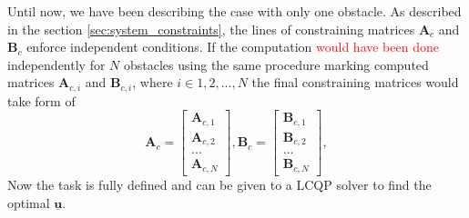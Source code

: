 \documentclass[a4paper,11pt,titlepage]{article}
\begin{document}
Until now, we have been describing the case with only one obstacle. As described in the section \ref{sec:system_constraints}, the lines of constraining matrices $\textbf{A}_c$ and $\textbf{B}_c$  enforce independent conditions. If the computation \textcolor{red}{would have been done} independently for $N$ obstacles using the same procedure marking computed matrices $\textbf{A}_{c,i}$ and $\textbf{B}_{c,i}$, where $i \in {1, 2, ..., N}$ the final constraining matrices would take form of
\begin{equation}
\textbf{A}_c =
  \begin{bmatrix}
  \textbf{A}_{c,1} \\
  \textbf{A}_{c,2} \\
  ...	   \\
  \textbf{A}_{c,N}
  \end{bmatrix},\textbf{B}_c = \begin{bmatrix}
  \textbf{B}_{c,1} \\
  \textbf{B}_{c,2} \\
  ...	   \\
  \textbf{B}_{c,N}
  \end{bmatrix}, 
\end{equation}
Now the task is fully defined and can be given to a LCQP solver to find the optimal $\underline{\textbf{u}}$. 
\end{document}
